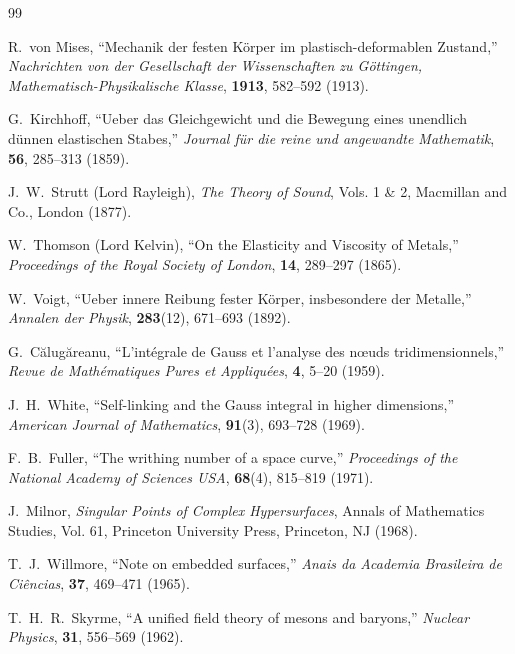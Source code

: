 \documentclass[12pt,a4paper]{article}
\begin{document}
\begin{thebibliography}{99}
	
	R.~von Mises, 
	``Mechanik der festen K{\"o}rper im plastisch-deformablen Zustand,''
	\textit{Nachrichten von der Gesellschaft der Wissenschaften zu G{\"o}ttingen, Mathematisch-Physikalische Klasse}, \textbf{1913}, 582--592 (1913).
	
	G.~Kirchhoff, 
	``Ueber das Gleichgewicht und die Bewegung eines unendlich d{\"u}nnen elastischen Stabes,''
	\textit{Journal f{\"u}r die reine und angewandte Mathematik}, \textbf{56}, 285--313 (1859).
	
	J.~W.~Strutt (Lord Rayleigh), 
	\textit{The Theory of Sound}, Vols. 1 \& 2, 
	Macmillan and Co., London (1877).
	
	W.~Thomson (Lord Kelvin), 
	``On the Elasticity and Viscosity of Metals,''
	\textit{Proceedings of the Royal Society of London}, \textbf{14}, 289--297 (1865).
	
	W.~Voigt, 
	``Ueber innere Reibung fester K{\"o}rper, insbesondere der Metalle,''
	\textit{Annalen der Physik}, \textbf{283}(12), 671--693 (1892).
	
	G.~C{\u{a}}lug{\u{a}}reanu, 
	``L'int{\'e}grale de Gauss et l'analyse des n{\oe}uds tridimensionnels,''
	\textit{Revue de Math{\'e}matiques Pures et Appliqu{\'e}es}, \textbf{4}, 5--20 (1959).
	
	J.~H.~White, 
	``Self-linking and the Gauss integral in higher dimensions,''
	\textit{American Journal of Mathematics}, \textbf{91}(3), 693--728 (1969).
	
	F.~B.~Fuller, 
	``The writhing number of a space curve,''
	\textit{Proceedings of the National Academy of Sciences USA}, \textbf{68}(4), 815--819 (1971).
	
	J.~Milnor, 
	\textit{Singular Points of Complex Hypersurfaces}, 
	Annals of Mathematics Studies, Vol. 61, Princeton University Press, Princeton, NJ (1968).
	
	T.~J.~Willmore, 
	``Note on embedded surfaces,''
	\textit{Anais da Academia Brasileira de Ci{\^e}ncias}, \textbf{37}, 469--471 (1965).
	
	T.~H.~R.~Skyrme, 
	``A unified field theory of mesons and baryons,''
	\textit{Nuclear Physics}, \textbf{31}, 556--569 (1962).
	

\end{thebibliography}
\end{document}
